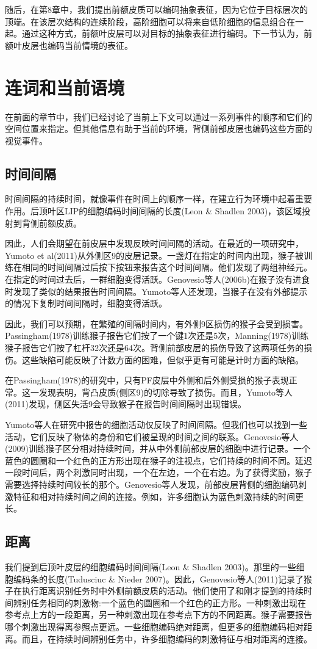 随后，在第8章中，我们提出前额皮质可以编码抽象表征，因为它位于目标层次的顶端。在该层次结构的连续阶段，高阶细胞可以将来自低阶细胞的信息组合在一起。通过这种方式，前额叶皮层可以对目标的抽象表征进行编码。下一节认为，前额叶皮层也编码当前情境的表征。

\section{连词和当前语境}
在前面的章节中，我们已经讨论了当前上下文可以通过一系列事件的顺序和它们的空间位置来指定。但其他信息有助于当前的环境，背侧前部皮层也编码这些方面的视觉事件。

\subsection{时间间隔}
时间间隔的持续时间，就像事件在时间上的顺序一样，在建立行为环境中起着重要作用。后顶叶区LIP的细胞编码时间间隔的长度(Leon \& Shadlen 2003)，该区域投射到背侧前额皮质。

因此，人们会期望在前皮层中发现反映时间间隔的活动。在最近的一项研究中，Yumoto et al(2011)从外侧区9的皮层记录。一盏灯在指定的时间内出现，猴子被训练在相同的时间间隔过后按下按钮来报告这个时间间隔。他们发现了两组神经元。在指定的时间过去后，一群细胞变得活跃。Genovesio等人(2006b)在猴子没有进食时发现了类似的结果报告时间间隔。Yumoto等人还发现，当猴子在没有外部提示的情况下复制时间间隔时，细胞变得活跃。

因此，我们可以预期，在繁殖的间隔时间内，有外侧9区损伤的猴子会受到损害。Passingham(1978)训练猴子报告它们按了一个键1次还是5次，Manning(1978)训练猴子报告它们按了杠杆32次还是64次。背侧前部皮层的损伤导致了这两项任务的损伤。这些缺陷可能反映了计数方面的困难，但似乎更有可能是计时方面的缺陷。

在Passingham(1978)的研究中，只有PF皮层中外侧和后外侧受损的猴子表现正常。这一发现表明，背凸皮质(侧区9)的切除导致了损伤。而且，Yumoto等人(2011)发现，侧区失活9会导致猴子在报告时间间隔时出现错误。

Yumoto等人在研究中报告的细胞活动仅反映了时间间隔。但我们也可以找到一些活动，它们反映了物体的身份和它们被呈现的时间之间的联系。Genovesio等人(2009)训练猴子区分相对持续时间，并从中外侧前部皮层的细胞中进行记录。一个蓝色的圆圈和一个红色的正方形出现在猴子的注视点，它们持续的时间不同。延迟一段时间后，两个刺激同时出现，一个在左边，一个在右边。为了获得奖励，猴子需要选择持续时间较长的那个。Genovesio等人发现，前部皮层背侧的细胞编码刺激特征和相对持续时间之间的连接。例如，许多细胞认为蓝色刺激持续的时间更长。

\subsection{距离}
我们提到后顶叶皮层的细胞编码时间间隔(Leon \& Shadlen 2003)。那里的一些细胞编码条的长度(Tudusciuc \& Nieder 2007)。因此，Genovesio等人(2011)记录了猴子在执行距离识别任务时中外侧前额皮质的活动。他们使用了和刚才提到的持续时间辨别任务相同的刺激物:一个蓝色的圆圈和一个红色的正方形。一种刺激出现在参考点上方的一段距离，另一种刺激出现在参考点下方的不同距离。猴子需要报告哪个刺激出现得离参照点更远。一些细胞编码绝对距离，但更多的细胞编码相对距离。而且，在持续时间辨别任务中，许多细胞编码的刺激特征与相对距离的连接。

